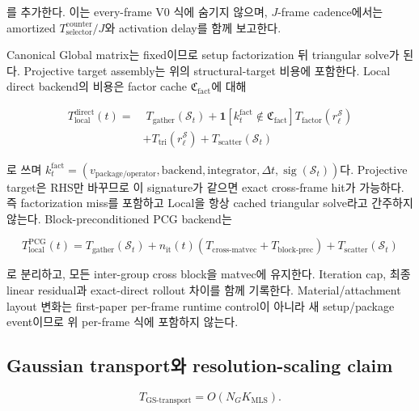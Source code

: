 \documentclass[11pt,a4paper]{article}
\begin{document}
를 추가한다. 이는 every-frame V0 식에 숨기지 않으며, \(J\)-frame cadence에서는
amortized \(T_{\mathrm{selector}}^{\mathrm{counter}}/J\)와 activation delay를 함께 보고한다.

Canonical Global matrix는 fixed이므로 setup factorization 뒤 triangular solve가 된다.
Projective target assembly는 위의 structural-target 비용에 포함한다.
Local direct backend의 비용은 factor cache \(\mathfrak C_{\mathrm{fact}}\)에 대해

\begin{equation}
\begin{aligned}
  T_{\mathrm{local}}^{\mathrm{direct}}(t)
  =&\;T_{\mathrm{gather}}(\mathcal S_t)
  +\mathbf 1[k_t^{\mathrm{fact}}\notin\mathfrak C_{\mathrm{fact}}]
   T_{\mathrm{factor}}(r_\ell^{\mathcal S})\\
  &+T_{\mathrm{tri}}(r_\ell^{\mathcal S})
  +T_{\mathrm{scatter}}(\mathcal S_t)
\end{aligned}
\end{equation}

로 쓰며
\(k_t^{\mathrm{fact}}
=(v_{\mathrm{package/operator}},\mathrm{backend},\mathrm{integrator},\Delta t,
\operatorname{sig}(\mathcal S_t))\)다.
Projective target은 RHS만 바꾸므로 이 signature가 같으면 exact cross-frame hit가 가능하다.
즉 factorization miss를 포함하고 Local을 항상 cached triangular solve라고 간주하지 않는다.
Block-preconditioned PCG backend는

\begin{equation}
  T_{\mathrm{local}}^{\mathrm{PCG}}(t)
  =T_{\mathrm{gather}}(\mathcal S_t)
  +n_{\mathrm{it}}(t)
  \left(T_{\mathrm{cross\mbox{-}matvec}}+T_{\mathrm{block\mbox{-}prec}}\right)
  +T_{\mathrm{scatter}}(\mathcal S_t)
\end{equation}

로 분리하고, 모든 inter-group cross block을 matvec에 유지한다.
Iteration cap, 최종 linear residual과 exact-direct rollout 차이를 함께 기록한다.
Material/attachment layout 변화는 first-paper per-frame runtime control이 아니라
새 setup/package event이므로 위 per-frame 식에 포함하지 않는다.

\subsection{Gaussian transport와 resolution-scaling claim}

\begin{equation}
  T_{\mathrm{GS\mbox{-}transport}}
  =
  O(N_GK_{\mathrm{MLS}}).
\end{equation}
\end{document}
